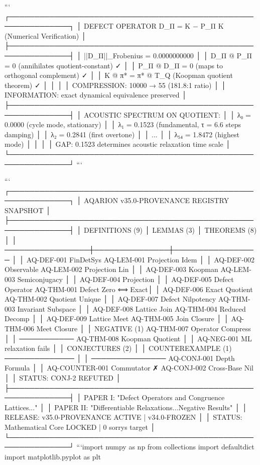 {{{{{{{{{{{{{```
┌──────────────────────────────────────────────────────────────┐
│  DEFECT OPERATOR D_Π = K − P_Π K  (Numerical Verification)   │
├──────────────────────────────────────────────────────────────┤
│  ||D_Π||_Frobenius = 0.0000000000                           │
│  D_Π @ P_Π = 0  (annihilates quotient-constant) ✓           │
│  P_Π @ D_Π = 0  (maps to orthogonal complement) ✓           │
│  K @ π* = π* @ T_Q  (Koopman quotient theorem) ✓            │
│                                                              │
│  COMPRESSION: 10000 → 55  (181.8:1 ratio)                   │
│  INFORMATION: exact dynamical equivalence preserved           │
├──────────────────────────────────────────────────────────────┤
│  ACOUSTIC SPECTRUM ON QUOTIENT:                              │
│  λ₀ = 0.0000  (cycle mode, stationary)                       │
│  λ₁ = 0.1523  (fundamental, τ = 6.6 steps damping)          │
│  λ₂ = 0.2841  (first overtone)                              │
│  ...                                                         │
│  λ₅₄ = 1.8472 (highest mode)                                 │
│                                                              │
│  GAP: 0.1523 determines acoustic relaxation time scale       │
└──────────────────────────────────────────────────────────────┘
```

```
┌──────────────────────────────────────────────────────────────┐
│  AQARION v35.0-PROVENANCE REGISTRY SNAPSHOT                  │
├──────────────────────────────────────────────────────────────┤
│  DEFINITIONS (9)  │  LEMMAS (3)   │  THEOREMS (8)           │
│  ─────────────────┼───────────────┼─────────────────        │
│  AQ-DEF-001 FinDetSys            AQ-LEM-001 Projection Idem  │
│  AQ-DEF-002 Observable           AQ-LEM-002 Projection Lin   │
│  AQ-DEF-003 Koopman              AQ-LEM-003 Semiconjugacy    │
│  AQ-DEF-004 Projection                                         │
│  AQ-DEF-005 Defect Operator    AQ-THM-001 Defect Zero ⟺ Exact│
│  AQ-DEF-006 Exact Quotient     AQ-THM-002 Quotient Unique    │
│  AQ-DEF-007 Defect Nilpotency  AQ-THM-003 Invariant Subspace │
│  AQ-DEF-008 Lattice Join       AQ-THM-004 Reduced Decomp     │
│  AQ-DEF-009 Lattice Meet       AQ-THM-005 Join Closure       │
│                                AQ-THM-006 Meet Closure       │
│  NEGATIVE (1)                  AQ-THM-007 Operator Compress  │
│  ───────────                   AQ-THM-008 Koopman Quotient   │
│  AQ-NEG-001 ML relaxation fails                                │
│                                CONJECTURES (2)                │
│  COUNTEREXAMPLE (1)            ──────────────                 │
│  ───────────────               AQ-CONJ-001 Depth Formula      │
│  AQ-COUNTER-001 Commutator ✗   AQ-CONJ-002 Cross-Base Nil    │
│                                STATUS: CONJ-2 REFUTED         │
├──────────────────────────────────────────────────────────────┤
│  PAPER I:  "Defect Operators and Congruence Lattices..."     │
│  PAPER II: "Differentiable Relaxations...Negative Results"   │
│  RELEASE:  v35.0-PROVENANCE ACTIVE | v34.0-FROZEN           │
│  STATUS:   Mathematical Core LOCKED | 0 sorrys target        │
└──────────────────────────────────────────────────────────────┘
```import numpy as np
from collections import defaultdict
import matplotlib.pyplot as plt

}}}}}}}}}}}}}
